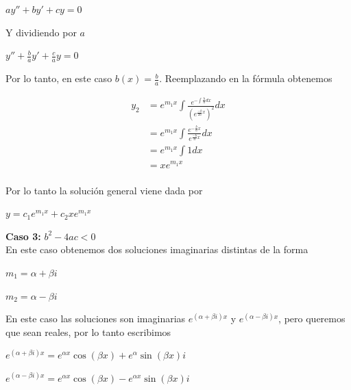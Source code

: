 \documentclass{article}
\theoremstyle{plain}
\theoremstyle{definition}
\begin{document}
\begin{center}
$ay''+by'+cy=0$
\end{center}

Y dividiendo por $a$

\begin{center}
$\displaystyle y''+\frac{b}{a} y'+ \frac{c}{a} y=0$
\end{center}

Por lo tanto, en este caso $b(x)= \displaystyle \frac{b}{a}$. Reemplazando en la fórmula obtenemos


\begin{align*}
y_2 &= \displaystyle e^{m_1x} \int \frac{e^{-\int \frac{b}{a} dx}}{\left( e^{\frac{-b}{2a}x}\right)^2}dx \\
&= \displaystyle e^{m_1x} \int \frac{e^{-\frac{b}{a} x}}{e^{\frac{-b}{a}x}}dx \\
&= \displaystyle e^{m_1x} \int 1 dx \\
&= xe^{m_1x} \\
\end{align*}


Por lo tanto la solución general viene dada por


\begin{center}
$y=c_1e^{m_1x}+c_2xe^{m_1 x}$
\end{center}




\textbf{Caso 3: } $b^2-4ac < 0$ \\

En este caso obtenemos dos soluciones imaginarias distintas de la forma

\begin{center}
$m_1= \alpha + \beta i$
\end{center}

\begin{center}
$m_2= \alpha - \beta i$
\end{center}


En este caso las soluciones son imaginarias $e^{(\alpha + \beta i)x}$ y $e^{(\alpha - \beta i)x}$, pero queremos que sean reales, por lo tanto escribimos


\begin{center}
$e^{(\alpha + \beta i)x} =e^{\alpha x}\cos(\beta x)+ e^{\alpha}\sin(\beta x)i$
\end{center}

\begin{center}
$e^{(\alpha - \beta i)x} = e^{\alpha x}\cos(\beta x) - e^{\alpha x}\sin(\beta x)i$
\end{center}
\end{document}
